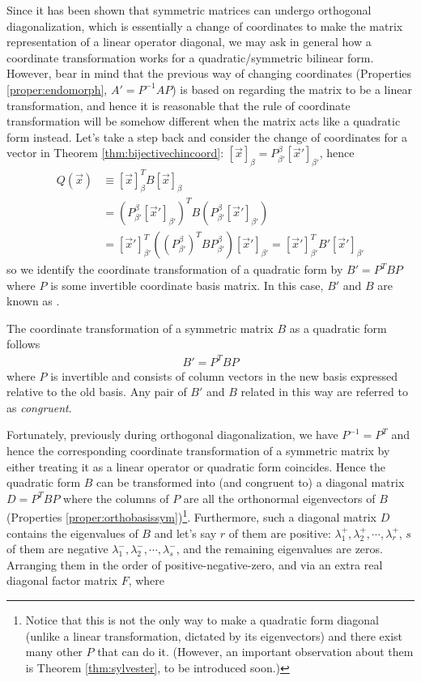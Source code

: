 Since it has been shown that symmetric matrices can undergo orthogonal diagonalization, which is essentially a change of coordinates to make the matrix representation of a linear operator diagonal, we may ask in general how a coordinate transformation works for a quadratic/symmetric bilinear form. However, bear in mind that the previous way of changing coordinates (Properties \ref{proper:endomorph}, $A' = P^{-1}AP$) is based on regarding the matrix to be a linear transformation, and hence it is reasonable that the rule of coordinate transformation will be somehow different when the matrix acts like a quadratic form instead. Let's take a step back and consider the change of coordinates for a vector in Theorem \ref{thm:bijectivechincoord}: $[\vec{x}]_\beta = P_{\beta'}^\beta [\vec{x}']_{\beta'}$, hence
\begin{align*}
Q(\vec{x}) &\equiv [\vec{x}]_\beta^T B [\vec{x}]_\beta \\
&= (P_{\beta'}^\beta [\vec{x}']_{\beta'})^T B (P_{\beta'}^\beta [\vec{x}']_{\beta'}) \\
&= [\vec{x}']_{\beta'}^T ((P_{\beta'}^\beta)^T B P_{\beta'}^\beta) [\vec{x}']_{\beta'} = [\vec{x}']_{\beta'}^T B' [\vec{x}']_{\beta'} 
\end{align*}
so we identify the coordinate transformation of a quadratic form by $B' = P^TBP$ where $P$ is some invertible coordinate basis matrix. In this case, $B'$ and $B$ are known as .
\begin{defn}
\label{defn:coordtransquad}
The coordinate transformation of a symmetric matrix $B$ as a quadratic form follows
\begin{align*}
B' = P^TBP
\end{align*}
where $P$ is invertible and consists of column vectors in the new basis expressed relative to the old basis. Any pair of $B'$ and $B$ related in this way are referred to as \textit{congruent}.
\end{defn}
Fortunately, previously during orthogonal diagonalization, we have $P^{-1} = P^T$ and hence the corresponding coordinate transformation of a symmetric matrix by either treating it as a linear operator or quadratic form coincides. Hence the quadratic form $B$ can be transformed into (and congruent to) a diagonal matrix $D = P^TBP$ where the columns of $P$ are all the orthonormal eigenvectors of $B$ (Properties \ref{proper:orthobasissym})\footnote{Notice that this is not the only way to make a quadratic form diagonal (unlike a linear transformation, dictated by its eigenvectors) and there exist many other $P$ that can do it. (However, an important observation about them is Theorem \ref{thm:sylvester}, to be introduced soon.)}. Furthermore, such a diagonal matrix $D$ contains the eigenvalues of $B$ and let's say $r$ of them are positive: $\lambda_1^+, \lambda_2^+, \cdots, \lambda_r^+$, $s$ of them are negative $\lambda_1^-,  \lambda_2^-, \cdots, \lambda_s^-$, and the remaining eigenvalues are zeros. Arranging them in the order of positive-negative-zero, and via an extra real diagonal factor matrix $F$, where
